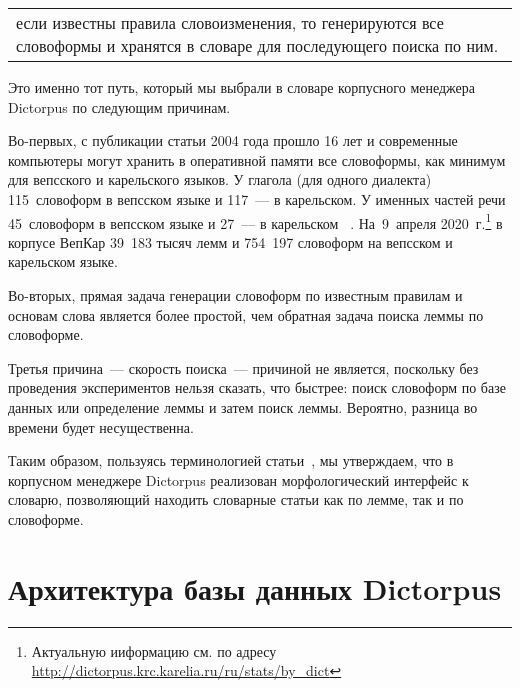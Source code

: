 \begin{tabular}{|p{15cm}}
если известны правила словоизменения, то генерируются все словоформы и хранятся в словаре для последующего поиска по ним. 
\end{tabular}

\noindent
Это именно тот путь, который мы выбрали в словаре корпусного менеджера Dictorpus 
по следующим причинам. 

Во-первых, с публикации статьи 2004 года прошло 16 лет и современные компьютеры могут хранить в оперативной памяти все словоформы, как минимум для вепсского и карельского языков. У глагола (для одного диалекта) 115~словоформ в вепсском языке и 117~--- в карельском. У именных частей речи 45~словоформ в вепсском языке и 27~--- в карельском~\cite[с.~415--428]{ZaitsevaNG2012OrphDict} \cite{NovakPenttonenRuuskanenSiilin2019, Zaikov2000KarGram, ZaitsevaMI1981, ZaitsevaNG1981VepsName, ZaitsevaNG2002VepsVerb}. На~9~апреля 2020~г.\footnote{Актуальную ииформацию см. по адресу \url{http://dictorpus.krc.karelia.ru/ru/stats/by_dict}} в корпусе ВепКар 39~183 тысяч лемм и 754~197 словоформ на вепсском и карельском языке.

Во-вторых, прямая задача генерации словоформ по известным правилам и основам слова является более простой, чем обратная задача поиска леммы по словоформе.

Третья причина~--- скорость поиска~--- причиной не является, 
поскольку без проведения экспериментов нельзя сказать, что быстрее: 
поиск словоформ по базе данных или определение леммы и затем поиск леммы. 
Вероятно, разница во времени будет несущественна.

Таким образом, пользуясь терминологией статьи~\cite{morphoAPI2dict2004Maxwell}, 
мы утверждаем, что в корпусном менеджере Dictorpus 
реализован морфологический интерфейс к словарю, 
позволяющий находить словарные статьи как по лемме, так и по словоформе.




\section{Архитектура базы данных Dictorpus} \label{sect_arch_db}

